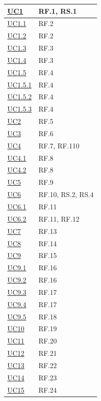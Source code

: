 \documentclass[12pt, a4paper]{article}
\begin{document}
\begin{longtable}{|l|p{}|}
\hyperref[uc:1]{UC1} & RF.1, RS.1 \\ \hline
\hyperref[uc:1.1]{UC1.1} & RF.2 \\ \hline
\hyperref[uc:1.2]{UC1.2} & RF.2 \\ \hline
\hyperref[uc:1.3]{UC1.3} & RF.3 \\ \hline
\hyperref[uc:1.4]{UC1.4} & RF.3 \\ \hline
\hyperref[uc:1.5]{UC1.5} & RF.4 \\ \hline
\hyperref[uc:1.5.1]{UC1.5.1} & RF.4 \\ \hline
\hyperref[uc:1.5.2]{UC1.5.2} & RF.4 \\ \hline
\hyperref[uc:1.5.3]{UC1.5.3} & RF.4 \\ \hline
\hyperref[uc:2]{UC2} & RF.5 \\ \hline
\hyperref[uc:3]{UC3} & RF.6 \\ \hline
\hyperref[uc:4]{UC4} & RF.7, RF.110 \\ \hline
\hyperref[uc:4.1]{UC4.1} & RF.8 \\ \hline
\hyperref[uc:4.2]{UC4.2} & RF.8 \\ \hline
\hyperref[uc:5]{UC5} & RF.9 \\ \hline
\hyperref[uc:6]{UC6} & RF.10, RS.2, RS.4 \\ \hline
\hyperref[uc:6.1]{UC6.1} & RF.11 \\ \hline
\hyperref[uc:6.2]{UC6.2} & RF.11, RF.12 \\ \hline
\hyperref[uc:7]{UC7} & RF.13 \\ \hline
\hyperref[uc:8]{UC8} & RF.14 \\ \hline
\hyperref[uc:9]{UC9} & RF.15 \\ \hline
\hyperref[uc:9.1]{UC9.1} & RF.16 \\ \hline
\hyperref[uc:9.2]{UC9.2} & RF.16 \\ \hline
\hyperref[uc:9.3]{UC9.3} & RF.17 \\ \hline
\hyperref[uc:9.4]{UC9.4} & RF.17 \\ \hline
\hyperref[uc:9.5]{UC9.5} & RF.18 \\ \hline
\hyperref[uc:10]{UC10} & RF.19 \\ \hline
\hyperref[uc:11]{UC11} & RF.20 \\ \hline
\hyperref[uc:12]{UC12} & RF.21 \\ \hline
\hyperref[uc:13]{UC13} & RF.22 \\ \hline
\hyperref[uc:14]{UC14} & RF.23 \\ \hline
\hyperref[uc:15]{UC15} & RF.24 \\ \hline

\end{longtable}
\end{document}
